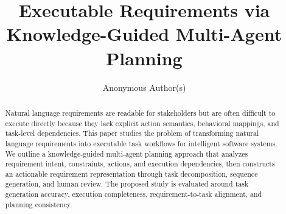 \documentclass[sigconf,anonymous,review]{acmart}
\title[Executable Requirements via Knowledge-Guided Multi-Agent Planning]%
{Executable Requirements via Knowledge-Guided Multi-Agent Planning}
\author{Anonymous Author(s)}
\affiliation{
  \institution{Anonymous Institution}
  \country{Anonymous Country}
}
\begin{document}
\begin{abstract}
Natural language requirements are readable for stakeholders but are often difficult to execute directly because they lack explicit action semantics, behavioral mappings, and task-level dependencies.
This paper studies the problem of transforming natural language requirements into executable task workflows for intelligent software systems.
We outline a knowledge-guided multi-agent planning approach that analyzes requirement intent, constraints, actions, and execution dependencies, then constructs an actionable requirement representation through task decomposition, sequence generation, and human review.
The proposed study is evaluated around task generation accuracy, execution completeness, requirement-to-task alignment, and planning consistency.
\end{abstract}



\maketitle



















\appendix



\end{document}
